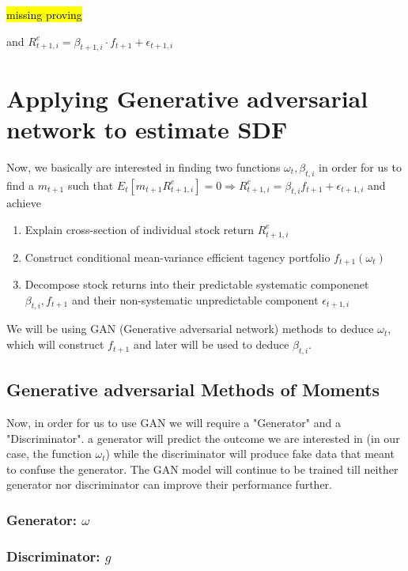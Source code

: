 \documentclass[11pt, oneside]{article}   	%
\begin{document}
\hl{missing proving}

and $R^e_{t+1, i} = \beta_{t+1, i}\cdot f_{t+1} + \epsilon_{t+1, i}$

\section{Applying Generative adversarial network to estimate SDF}


Now, we basically are interested in finding two functions $\omega_t, \beta_{t, i}$ in order for us to find a $m_{t+1}$ such
that $E_t[m_{t+1}R^e_{t+1, i}]=0 \Rightarrow R^e_{t+1, i} = \beta_{t, i}f_{t+1}+\epsilon_{t+1, i}$ and achieve

\begin{enumerate}
    \item Explain cross-section of individual stock return $R^e_{t+1, i}$
    \item Construct conditional mean-variance efficient tagency portfolio $f_{t+1}(\omega_t)$
    \item Decompose stock returns into their predictable systematic componenet $\beta_{t, i}, f_{t+1}$ and their non-systematic unpredictable
        component $\epsilon_{t+1, i}$
\end{enumerate}

We will be using GAN (Generative adversarial network) methods to deduce $\omega_t$, which will construct $f_{t+1}$ and 
later will be used to deduce $\beta_{t, i}$.

\subsection{Generative adversarial Methods of Moments}

Now, in order for us to use GAN we will require a "Generator" and a "Discriminator". a generator will predict the
outcome we are interested in (in our case, the function $\omega_t$) while the discriminator will produce fake
data that meant to confuse the generator. The GAN model will continue to be trained till neither 
generator nor discriminator can improve their performance further.

\subsubsection{Generator: $\omega$}

\subsubsection{Discriminator: $g$}
\end{document}
